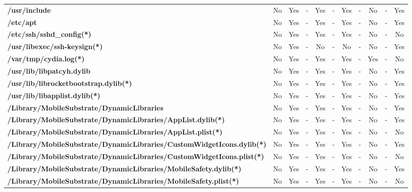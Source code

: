 \begin{center}
{\begin{tabular}{|>{\bfseries} l | C | C | C | C | C | C | C | C | C | C |}
					/usr/include & \color{green}No & \color{red}Yes & - & Yes & - & Yes & - & No & - & Yes\\ 
					/etc/apt & \color{green}No & \color{red}Yes & - & Yes & - & Yes & - & No & - & Yes\\ 
					/etc/ssh/sshd\_config(*) & \color{green}No & \color{red}Yes & - & Yes & - & Yes & - & No & - & No\\ 
					/usr/libexec/ssh-keysign(*) & \color{green}No & \color{red}Yes & - & No & - & No & - & No & - & Yes\\ 
					/var/tmp/cydia.log(*) & \color{green}No & \color{red}Yes & - & Yes & - & Yes & - & Yes & - & No\\ 
					/usr/lib/libpatcyh.dylib & \color{green}No & \color{red}Yes & - & Yes & - & Yes & - & No & - & Yes\\ 
					/usr/lib/librocketbootstrap.dylib(*) & \color{green}No & \color{red}Yes & - & Yes & - & Yes & - & No & - & Yes\\ 
					/usr/lib/libapplist.dylib(*) & \color{green}No & \color{red}Yes & - & Yes & - & Yes & - & No & - & Yes\\ 
					/Library/MobileSubstrate/DynamicLibraries & \color{green}No & \color{red}Yes & - & Yes & - & Yes & - & No & - & Yes\\ 
					/Library/MobileSubstrate/DynamicLibraries/AppList.dylib(*) & \color{green}No & \color{red}Yes & - & Yes & - & Yes & - & No & - & Yes\\ 
					/Library/MobileSubstrate/DynamicLibraries/AppList.plist(*) & \color{green}No & \color{red}Yes & - & Yes & - & Yes & - & No & - & No\\ 
					/Library/MobileSubstrate/DynamicLibraries/CustomWidgetIcons.dylib(*) & \color{green}No & \color{red}Yes & - & Yes & - & Yes & - & No & - & Yes\\ 
					/Library/MobileSubstrate/DynamicLibraries/CustomWidgetIcons.plist(*) & \color{green}No & \color{red}Yes & - & Yes & - & Yes & - & No & - & No\\ 
					/Library/MobileSubstrate/DynamicLibraries/MobileSafety.dylib(*) & \color{green}No & \color{red}Yes & - & Yes & - & Yes & - & No & - & Yes\\ 
					/Library/MobileSubstrate/DynamicLibraries/MobileSafety.plist(*) & \color{green}No & \color{red}Yes & - & Yes & - & Yes & - & No & - & No\\ 

			\end{tabular}
		}
	\end{center}



